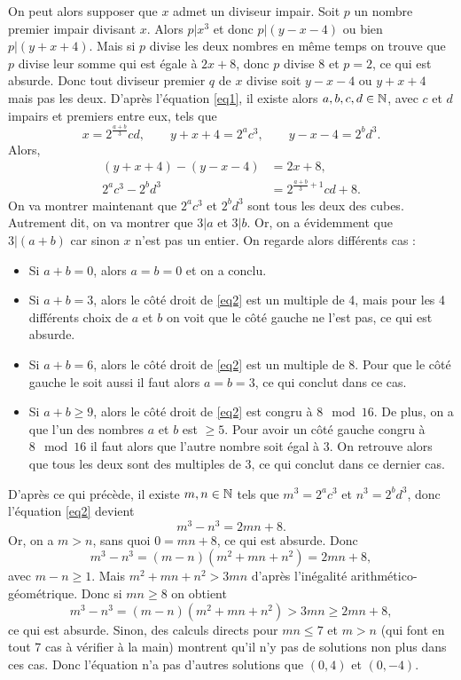 \begin{sol}[116]
On peut alors supposer que $x$ admet un diviseur impair. Soit $p$ un nombre premier impair divisant $x$. Alors $p|x^3$ et donc $p|(y-x-4)$ ou bien $p|(y+x+4)$. Mais si $p$ divise les deux nombres en m\^eme temps on trouve que $p$ divise leur somme qui est \'egale \`a $2x+8$, donc $p$ divise $8$ et $p=2$, ce qui est absurde. Donc tout diviseur premier $q$ de $x$ divise soit $y-x-4$ ou $y+x+4$ mais pas les deux. D'apr\`es l'\'equation \eqref{eq1}, il existe alors $a,b,c,d\in\mathbb{N}$, avec $c$ et $d$ impairs et premiers entre eux, tels que
\[x=2^{\frac{a+b}{3}}cd,\qquad y+x+4=2^ac^3,\qquad y-x-4=2^bd^3.\]
Alors,
\begin{align*}
(y+x+4)-(y-x-4) &=2x+8,\\
2^ac^3-2^bd^3&=2^{\frac{a+b}{3}+1}cd+8.\tag{2}\label{eq2}
\end{align*}
On va montrer maintenant que $2^ac^3$ et $2^bd^3$ sont tous les deux des cubes. Autrement dit, on va montrer que $3|a$ et $3|b$. Or, on a \'evidemment que $3|(a+b)$ car sinon $x$ n'est pas un entier. On regarde alors diff\'erents cas :
\begin{itemize}
\item Si $a+b=0$, alors $a=b=0$ et on a conclu.
\item Si $a+b=3$, alors le c\^ot\'e droit de \eqref{eq2} est un multiple de 4, mais pour les 4 diff\'erents choix de $a$ et $b$ on voit que le c\^ot\'e gauche ne l'est pas, ce qui est absurde.
\item Si $a+b=6$, alors le c\^ot\'e droit de \eqref{eq2} est un multiple de 8. Pour que le c\^ot\'e gauche le soit aussi il faut alors $a=b=3$, ce qui conclut dans ce cas.
\item Si $a+b\geq 9$, alors le c\^ot\'e droit de \eqref{eq2} est congru \`a $8\mod 16$. De plus, on a que l'un des nombres $a$ et $b$ est $\geq 5$. Pour avoir un c\^ot\'e gauche congru \`a $8\mod 16$ il faut alors que l'autre nombre soit \'egal \`a $3$. On retrouve alors que tous les deux sont des multiples de 3, ce qui conclut dans ce dernier cas.\\
\end{itemize}

D'apr\`es ce qui pr\'ec\`ede, il existe $m,n\in\mathbb{N}$ tels que $m^3=2^ac^3$ et $n^3=2^bd^3$, donc l'\'equation \eqref{eq2} devient
\[m^3-n^3=2mn+8.\]
Or, on a $m>n$, sans quoi $0=mn+8$, ce qui est absurde. Donc
\[m^3-n^3=(m-n)(m^2+mn+n^2)=2mn+8,\]
avec $m-n\geq 1$. Mais $m^2+mn+n^2 >3mn$ d'apr\`es l'in\'egalit\'e arithm\'etico-g\'eom\'etrique. Donc si $mn\geq 8$ on obtient
\[m^3-n^3=(m-n)(m^2+mn+n^2)> 3mn\geq 2mn+8,\]
ce qui est absurde. Sinon, des calculs directs pour $mn\leq 7$ et $m>n$ (qui font en tout 7 cas \`a v\'erifier \`a la main) montrent qu'il n'y pas de solutions non plus dans ces cas. Donc l'\'equation n'a pas d'autres solutions que $(0,4)$ et $(0,-4)$.
\end{sol}



